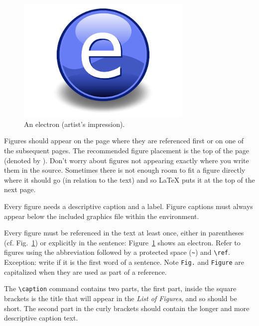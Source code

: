 \begin{figure}[t]
\centering
\includegraphics[width=0.75\textwidth]{Figures/Electron}
\decoRule
\caption[An Electron]{An electron (artist's impression).}
\label{fig:Electron}
\end{figure}

Figures should appear on the page where they are referenced first or on one of the subsequent pages. The recommended figure placement is the top of the page (denoted by \code{[t]}). Don't worry about figures not appearing exactly where you write them in the source. Sometimes there is not enough room to fit a figure directly where it should go (in relation to the text) and so LaTeX puts it at the top of the next page.

Every figure needs a descriptive caption and a label. Figure captions must always appear below the included graphics file within the  environment.

Every figure must be referenced in the text at least once, either in parentheses (cf. Fig.~\ref{fig:Electron}) or explicitly in the sentence: Figure~\ref{fig:Electron} shows an electron. Refer to figures using the abbreviation  followed by a protected space (\verb|~|) and \verb|\ref|. Exception: write  if it is the first word of a sentence. Note \verb|Fig.| and \verb|Figure| are capitalized when they are used as part of a reference.

The \verb|\caption| command contains two parts,%
the first part, inside the square brackets is the title that will appear in the \emph{List of Figures}, and so should be short.
 The second part in the curly brackets should contain the longer and more descriptive caption text.

